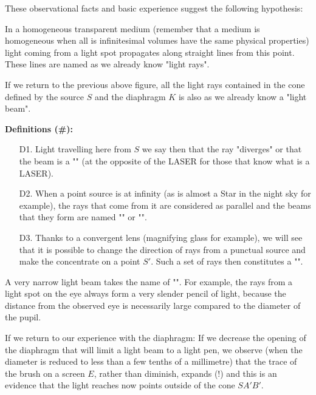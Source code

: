 	These observational facts and basic experience suggest the following hypothesis: 
	
	In a homogeneous transparent medium (remember that a medium is homogeneous when all is infinitesimal volumes have the same physical properties) light coming from a light spot propagates along straight lines from this point. These lines are named as we already know "light rays".
	
	If we return to the previous above figure, all the light rays contained in the cone defined by the source $S$ and the diaphragm $K$ is also as we already know a "light beam".
	
	\textbf{Definitions (\#\mydef):}
	\begin{enumerate}
		\item[D1.] Light travelling here from $S$ we say then that the ray "diverges" or that the beam is a "" (at the opposite of the LASER for those that know what is a LASER).
		
		\item[D2.] When a point source is at infinity (as is almost a Star in the night sky for example), the rays that come from it are considered as parallel and the beams that they form are named "" or "".
		
		\item[D3.] Thanks to a convergent lens (magnifying glass for example), we will see that it is possible to change the direction of rays from a punctual source and make the concentrate on a point $S'$. Such a set of rays then constitutes a "".
	\end{enumerate}
	
	A very narrow light beam takes the name of "". For example, the rays from a light spot on the eye always form a very slender pencil of light, because the distance from the observed eye is necessarily large compared to the diameter of the pupil.
	
	If we return to our experience with the diaphragm: If we decrease the opening of the diaphragm that will limit  a light beam to a light pen, we observe (when the diameter is reduced to less than a few tenths of a millimetre) that the trace of the brush on a screen $E$, rather than diminish, expands (!) and this is an evidence that the light reaches now points outside of the cone $SA'B'$.
	
